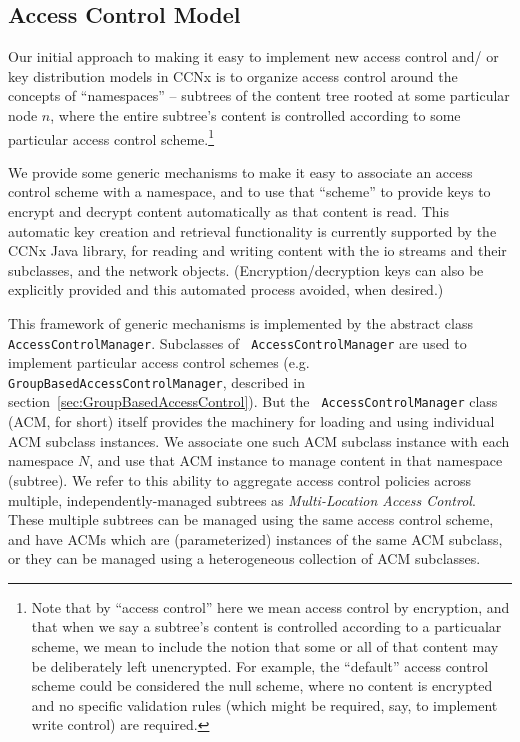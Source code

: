 \subsection{Access Control Model}
\label{sec:model}

Our initial approach to making it easy to implement new access control and/
or key distribution models in CCNx is to organize access control around
the concepts of ``namespaces'' -- subtrees of the content tree rooted
at some particular node $n$, where the entire subtree's content is
controlled according to some particular access control scheme.\footnote{
Note that by ``access control'' here we mean access control by encryption,
and that when we say a subtree's content is controlled according to a particualar
scheme, we mean to include the notion that some or all of that content may be
deliberately left unencrypted. For example, the ``default'' access control
scheme could be considered the null scheme, where no content is encrypted and
no specific validation rules (which might be required, say, to implement
write control) are required.}

We provide some generic mechanisms to make it easy to associate an
access control scheme with a namespace, and to use that ``scheme'' to
provide keys to encrypt and decrypt content automatically as that
content is read. This automatic key creation and retrieval
functionality is currently supported by the CCNx Java library, for
reading and writing content with the io streams and their subclasses,
and the network objects. (Encryption/decryption keys can also be explicitly
provided and this automated process avoided, when desired.)

This framework of generic mechanisms is implemented by the abstract
class {\tt AccessControlManager}.  Subclasses of {\tt
  AccessControlManager} are used to implement particular access
control schemes (e.g. {\tt GroupBasedAccessControlManager}, described
in section~\ref{sec:GroupBasedAccessControl}). But the {\tt
  AccessControlManager} class (ACM, for short) itself provides the
machinery for loading and using individual ACM subclass instances. We
associate one such ACM subclass instance with each namespace $N$, and
use that ACM instance to manage content in that namespace
(subtree). We refer to this ability to aggregate access control
policies across multiple, independently-managed subtrees as
\emph{Multi-Location Access Control}. These multiple subtrees can
be managed using the same access control scheme, and have ACMs which are
(parameterized) instances of the same ACM subclass, or they can be managed
using a heterogeneous collection of ACM subclasses.

